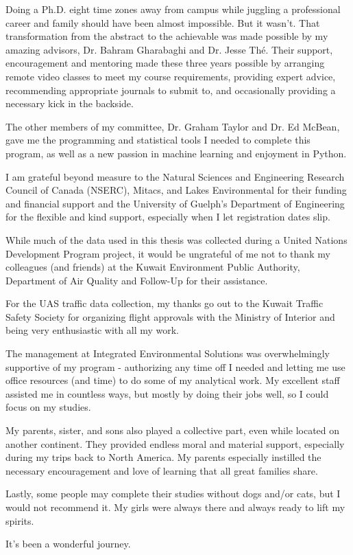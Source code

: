 \begin{acknowledgements}\label{acknow}

Doing a Ph.D. eight time zones away from campus while juggling a professional career and family should have been almost impossible. But it wasn't. That transformation from the abstract to the achievable was made possible by my amazing advisors, Dr. Bahram Gharabaghi and Dr. Jesse Th\'e. Their support, encouragement and mentoring made these three years possible by arranging remote video classes to meet my course requirements, providing expert advice, recommending appropriate journals to submit to, and occasionally providing a necessary kick in the backside.

The other members of my committee, Dr. Graham Taylor and Dr. Ed McBean, gave me the programming and statistical tools I needed to complete this program, as well as a new passion in machine learning and enjoyment in Python.

I am grateful beyond measure to the Natural Sciences and Engineering Research Council of Canada (NSERC), Mitacs, and Lakes Environmental for their funding and financial support and the University of Guelph's Department of Engineering for the flexible and kind support, especially when I let registration dates slip.

While much of the data used in this thesis was collected during a United Nations Development Program project, it would be ungrateful of me not to thank my colleagues (and friends) at the Kuwait Environment Public Authority, Department of Air Quality and Follow-Up for their assistance.

For the UAS traffic data collection, my thanks go out to the Kuwait Traffic Safety Society for organizing flight approvals with the Ministry of Interior and being very enthusiastic with all my work.

The management at Integrated Environmental Solutions was overwhelmingly supportive of my program - authorizing any time off I needed and letting me use office resources (and time) to do some of my analytical work. My excellent staff assisted me in countless ways, but mostly by doing their jobs well, so I could focus on my studies.

My parents, sister, and sons also played a collective part, even while located on another continent. They provided endless moral and material support, especially during my trips back to North America. My parents especially instilled the necessary encouragement and love of learning that all great families share.

Lastly, some people may complete their studies without dogs and/or cats, but I would not recommend it. My girls were always there and always ready to lift my spirits.

It's been a wonderful journey.

\end{acknowledgements}
